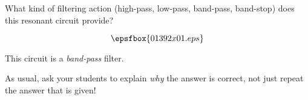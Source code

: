 

What kind of filtering action (high-pass, low-pass, band-pass, band-stop) does this resonant circuit provide?

$$\epsfbox{01392x01.eps}$$







This circuit is a {\it band-pass} filter.







As usual, ask your students to explain {\it why} the answer is correct, not just repeat the answer that is given!





